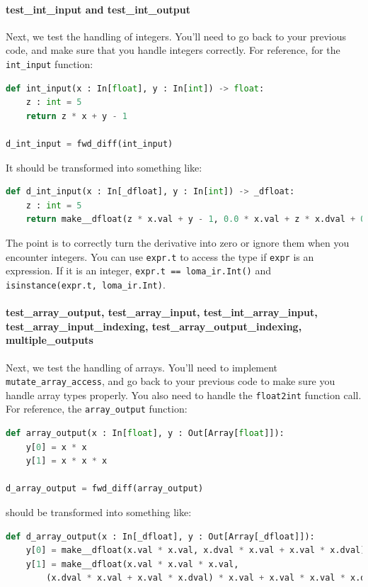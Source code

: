 \paragraph{test_int_input and test_int_output} Next, we test the handling of integers. You'll need to go back to your previous code, and make sure that you handle integers correctly. For reference, for the \lstinline{int_input} function:
\begin{lstlisting}[language=Python]
def int_input(x : In[float], y : In[int]) -> float:
    z : int = 5
    return z * x + y - 1

d_int_input = fwd_diff(int_input)
\end{lstlisting}
It should be transformed into something like:
\begin{lstlisting}[language=Python]
def d_int_input(x : In[_dfloat], y : In[int]) -> _dfloat:
    z : int = 5
    return make__dfloat(z * x.val + y - 1, 0.0 * x.val + z * x.dval + 0.0 - 0.0)
\end{lstlisting}
The point is to correctly turn the derivative into zero or ignore them when you encounter integers. You can use \lstinline{expr.t} to access the type if \lstinline{expr} is an expression. If it is an integer, \lstinline{expr.t == loma_ir.Int()} and \lstinline{isinstance(expr.t, loma_ir.Int)}.

\paragraph{test_array_output, test_array_input, test_int_array_input, test_array_input_indexing, test_array_output_indexing, multiple_outputs} Next, we test the handling of arrays. You'll need to implement \lstinline{mutate_array_access}, and go back to your previous code to make sure you handle array types properly. You also need to handle the \lstinline{float2int} function call. For reference, the \lstinline{array_output} function:
\begin{lstlisting}[language=Python]
def array_output(x : In[float], y : Out[Array[float]]):
    y[0] = x * x
    y[1] = x * x * x

d_array_output = fwd_diff(array_output)
\end{lstlisting}
should be transformed into something like:
\begin{lstlisting}[language=Python]
def d_array_output(x : In[_dfloat], y : Out[Array[_dfloat]]):
    y[0] = make__dfloat(x.val * x.val, x.dval * x.val + x.val * x.dval)
    y[1] = make__dfloat(x.val * x.val * x.val,
        (x.dval * x.val + x.val * x.dval) * x.val + x.val * x.val * x.dval)
\end{lstlisting}

